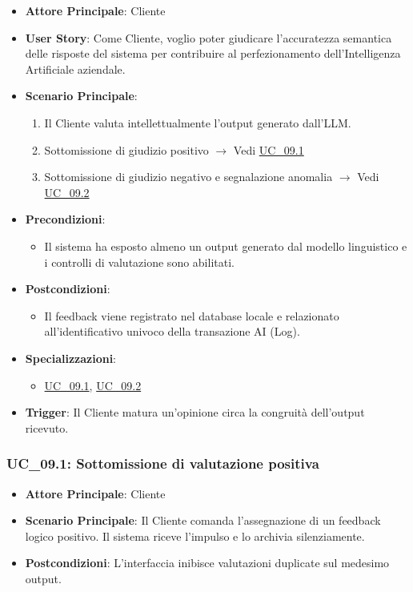 \begin{itemize}
    \item \textbf{Attore Principale}: Cliente
    \item \textbf{User Story}: Come Cliente, voglio poter giudicare l'accuratezza semantica delle risposte del sistema per contribuire al perfezionamento dell'Intelligenza Artificiale aziendale.
    \item \textbf{Scenario Principale}:
    \begin{enumerate}
        \item Il Cliente valuta intellettualmente l'output generato dall'LLM.
        \item Sottomissione di giudizio positivo $\rightarrow$ Vedi \hyperref[uc_09.1]{UC\_09.1}
        \item Sottomissione di giudizio negativo e segnalazione anomalia $\rightarrow$ Vedi \hyperref[uc_09.2]{UC\_09.2}
    \end{enumerate}
    \item \textbf{Precondizioni}:
    \begin{itemize}
        \item Il sistema ha esposto almeno un output generato dal modello linguistico e i controlli di valutazione sono abilitati.
    \end{itemize}
    \item \textbf{Postcondizioni}:
    \begin{itemize}
        \item Il feedback viene registrato nel database locale e relazionato all'identificativo univoco della transazione AI (Log).
    \end{itemize}
    \item \textbf{Specializzazioni}:
    \begin{itemize}
        \item \hyperref[uc_09.1]{UC\_09.1}, \hyperref[uc_09.2]{UC\_09.2}
    \end{itemize}
    \item \textbf{Trigger}: Il Cliente matura un'opinione circa la congruità dell'output ricevuto.
\end{itemize}

\subsubsection{UC\_09.1: Sottomissione di valutazione positiva}
\label{uc_09.1}
\begin{itemize}
    \item \textbf{Attore Principale}: Cliente
    \item \textbf{Scenario Principale}: Il Cliente comanda l'assegnazione di un feedback logico positivo. Il sistema riceve l'impulso e lo archivia silenziamente.
    \item \textbf{Postcondizioni}: L'interfaccia inibisce valutazioni duplicate sul medesimo output.
\end{itemize}

